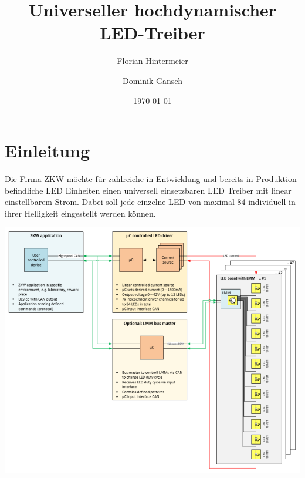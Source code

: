 \documentclass[paper=a4, 12pt]{scrreprt}
\title{Universeller hochdynamischer LED-Treiber}
\author{Florian Hintermeier \and Dominik Gansch}
\date{\today}
\begin{document}
\frontmatter

\maketitle

\newpage\null\thispagestyle{empty}\newpage

\begin{affidavit}
\end{affidavit}




\tableofcontents

\mainmatter

\chapter{Einleitung}
    Die Firma ZKW möchte für zahlreiche in Entwicklung und bereits in Produktion befindliche LED Einheiten einen universell einsetzbaren LED Treiber mit linear einstellbarem Strom. Dabei soll jede einzelne LED von maximal 84 individuell in ihrer Helligkeit eingestellt werden können.
    
	\begin{adjustbox}{center,caption={Blockschaltbild von ZKW},label={ZKW-Blockschaltbild},nofloat=figure,vspace=\bigskipamount}
	\includegraphics[width=15cm]{img/ZKW_Blockschaltbild.PNG}
	\end{adjustbox}
\end{document}
